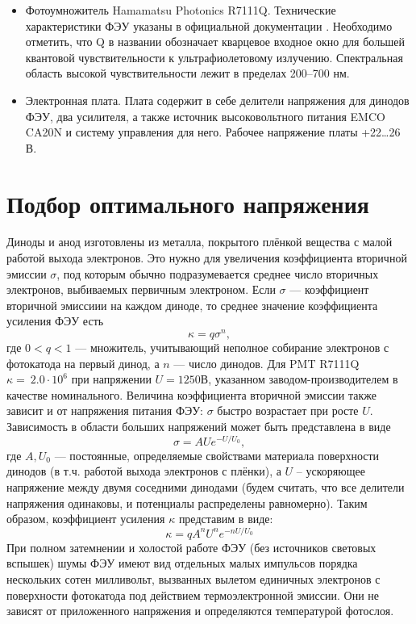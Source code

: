 \documentclass[12pt,a4paper]{report} %
\begin{document}
\begin{itemize}
	\item Фотоумножитель Hamamatsu Photonics R7111Q. Технические характеристики ФЭУ указаны в официальной документации \cite{Hamamatsu}. Необходимо отметить, что Q  в названии обозначает кварцевое входное окно для большей квантовой чувствительности к ультрафиолетовому излучению. Спектральная область высокой чувствительности лежит в пределах 200--700 нм. 
	\item Электронная плата. Плата содержит в себе делители напряжения для динодов ФЭУ, два усилителя, а также источник высоковольтного питания EMCO CA20N и систему управления для него. Рабочее напряжение платы +22\dots26 В. 
\end{itemize}

\section{Подбор оптимального напряжения}
Диноды и анод изготовлены из металла, покрытого плёнкой вещества с малой работой выхода электронов. Это нужно для увеличения коэффициента вторичной эмиссии $\sigma$, под которым обычно подразумевается среднее число вторичных электронов, выбиваемых первичным электроном. Если $\sigma$ --- коэффициент вторичной эмиссиии на каждом диноде, то среднее значение коэффициента усиления ФЭУ есть 
\begin{equation}
	\kappa = q\sigma^n, 
\end{equation}
где $0 <q <1$ --- множитель, учитывающий неполное собирание электронов с фотокатода на первый динод, а $n$ --- число динодов. Для PMT R7111Q $\kappa= ~2.0\cdot10^6$ при напряжении $U = 1250 В$, указанном заводом-производителем в качестве номинального. Величина коэффициента вторичной эмиссии также зависит и от напряжения питания ФЭУ: $\sigma$ быстро возрастает при росте $U$. Зависимость в области больших напряжений может быть представлена в виде
\begin{equation}
	\sigma = AUe^{-U/U_0},
\end{equation}
где $A, U_0$ --- постоянные, определяемые свойствами материала поверхности динодов (в т.ч. работой выхода электронов с плёнки), а $U$ -- ускоряющее напряжение между двумя соседними динодами (будем считать, что все делители напряжения одинаковы, и потенциалы распределены равномерно). Таким образом, коэффициент усиления $\kappa$ представим в виде:
\begin{equation}
	\kappa = qA^nU^ne^{-nU/U_0} 
\end{equation}
При полном затемнении и холостой работе ФЭУ (без источников световых вспышек) шумы ФЭУ имеют вид отдельных малых импульсов порядка нескольких сотен милливольт, вызванных вылетом единичных электронов с поверхности фотокатода под действием термоэлектронной эмиссии. Они не зависят от приложенного напряжения и определяются температурой фотослоя. 
\end{document}
